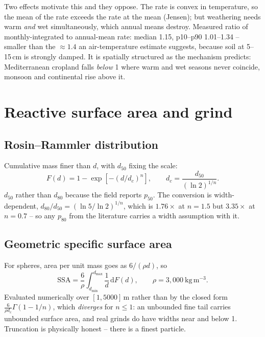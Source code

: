 \documentclass[11pt,a4paper]{article}
\begin{document}
Two effects motivate this and they oppose. The rate is convex in temperature, so
the mean of the rate exceeds the rate at the mean (Jensen); but weathering needs
warm \emph{and} wet simultaneously, which annual means destroy. Measured ratio of
monthly-integrated to annual-mean rate: median 1.15, p10--p90
1.01--1.34 -- smaller
than the $\approx 1.4$ an air-temperature estimate suggests, because soil at
5--15\,cm is strongly damped. It is spatially structured as the mechanism
predicts: Mediterranean cropland falls \emph{below} 1 where warm and wet seasons
never coincide, monsoon and continental rise above it.

\section{Reactive surface area and grind}
\label{sec:psd}

\subsection{Rosin--Rammler distribution}

Cumulative mass finer than $d$, with $d_{50}$ fixing the scale:
\begin{equation}
F(d) = 1 - \exp\!\left[-\left(d/d_c\right)^n\right],
\qquad d_c = \frac{d_{50}}{(\ln 2)^{1/n}} .
\end{equation}
$d_{50}$ rather than $d_{80}$ because the field reports $p_{50}$. The
conversion is width-dependent,
$d_{80}/d_{50} = (\ln 5/\ln 2)^{1/n}$, which is $1.76\times$ at $n=1.5$ but
$3.35\times$ at $n=0.7$ -- so any $p_{80}$ from the literature carries a width
assumption with it.

\subsection{Geometric specific surface area}

For spheres, area per unit mass goes as $6/(\rho d)$, so
\begin{equation}
\mathrm{SSA} = \frac{6}{\rho} \int_{d_{\min}}^{d_{\max}} \frac{1}{d}\,\mathrm{d}F(d),
\qquad \rho = 3,000\ \mathrm{kg\,m^{-3}} .
\end{equation}
Evaluated numerically over $[1, 5000]$\,\textmu m
rather than by the closed form $\tfrac{6}{\rho d_c}\Gamma(1 - 1/n)$, which
\emph{diverges} for $n \le 1$: an unbounded fine tail carries unbounded surface
area, and real grinds do have widths near and below 1. Truncation is physically
honest -- there is a finest particle.
\end{document}
